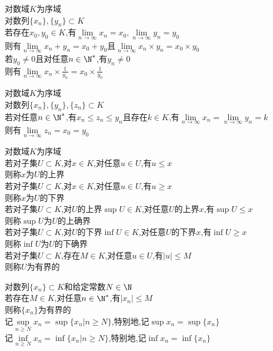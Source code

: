 \begin{dingli}
对数域$K$为序域\\
对数列$\{x_n\},\{y_n\}\subset K$\\
若存在$x_0,y_0\in K$,有$\lim\limits_{n\to\infty}x_n=x_0,\lim\limits_{n\to\infty}y_n=y_0$\\
则有$\lim\limits_{n\to\infty}x_n+y_n=x_0+y_0$且$\lim\limits_{n\to\infty}x_n\times y_n=x_0\times y_0$\\
若$y_0\neq 0$且对任意$n\in\N^*$,有$y_n\neq 0$\\
则有$\lim\limits_{n\to\infty}x_n\times\frac{1}{y_n}=x_0\times\frac{1}{y_0}$
\end{dingli}

\begin{dingli}
对数域$K$为序域\\
对数列$\{x_n\},\{y_n\},\{z_n\}\subset K$\\
若对任意$n\in \N^*$,有$x_n\leq z_n\leq y_n$且存在$k\in K$,有$\lim\limits_{n\to\infty}x_n=\lim\limits_{n\to\infty}y_n=k$\\
则有$\lim\limits_{n\to\infty}z_n=x_0=y_0$
\end{dingli}

\begin{dingyi}
对数域$K$为序域\\
若对子集$U\subset K$,对$x\in K$,对任意$u\in U$,有$u\leq x$\\
则称$x$为$U$的上界\\
若对子集$U\subset K$,对$x\in K$,对任意$u\in U$,有$u\geq x$\\
则称$x$为$U$的下界\\
若对子集$U\subset K$,对$U$的上界$\sup U\in K$,对任意$U$的上界$x$,有$\sup U\leq x$\\
则称$\sup U$为$U$的上确界\\
若对子集$U\subset K$,对$U$的下界$\inf U\in K$,对任意$U$的下界$x$,有$\inf U\geq x$\\
则称$\inf U$为$U$的下确界\\
若对子集$U\subset K$,存在$M\in K$,对任意$u\in U$,有$|u|\leq M$\\
则称$U$为有界的
\end{dingyi}

\begin{zhu}
对数列$\{x_n\}\subset K$和给定常数$N\in\N$\\
若存在$M\in K$,对任意$n\in \N^*$,有$|x_n|\leq M$\\
则称$\{x_n\}$为有界的\\
记$\sup\limits_{n\geq N}x_n=\sup\{x_n|n\geq N\}$,特别地,记$\sup x_n=\sup \{x_n\}$\\
记$\inf\limits_{n\geq N}x_n=\inf\{x_n|n\geq N\}$,特别地,记$\inf x_n=\inf \{x_n\}$
\end{zhu}

